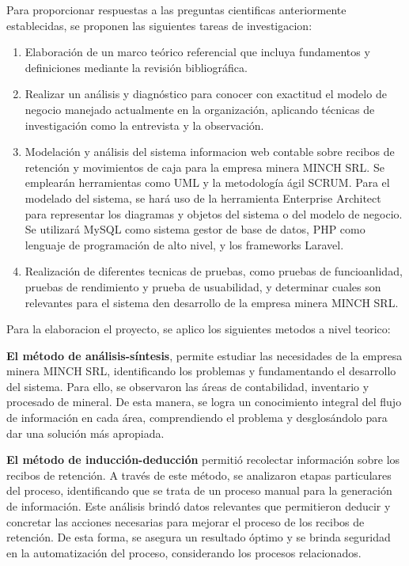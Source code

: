 \documentclass[stu]{apa7}
\begin{document}
Para proporcionar respuestas a las preguntas cientificas anteriormente establecidas, se proponen las siguientes tareas de investigacion:

\begin{enumerate}
    \item Elaboración de un marco teórico referencial que incluya fundamentos y definiciones mediante la revisión bibliográfica.

    \item Realizar un análisis y diagnóstico para conocer con exactitud el modelo de negocio manejado actualmente en la organización, aplicando técnicas de investigación como la entrevista y la observación.

    \item Modelación y análisis del sistema informacion web contable sobre recibos de retención y movimientos de caja para la empresa minera MINCH SRL. Se emplearán herramientas como UML y la metodología ágil SCRUM. Para el modelado del sistema, se hará uso de la herramienta Enterprise Architect para representar los diagramas y objetos del sistema o del modelo de negocio. Se utilizará MySQL como sistema gestor de base de datos, PHP como lenguaje de programación de alto nivel, y los frameworks Laravel.

    \item Realización de diferentes tecnicas de pruebas, como pruebas de funcioanlidad, pruebas de rendimiento y prueba de usuabilidad, y determinar cuales son relevantes para el sistema den desarrollo de la empresa minera MINCH SRL.
\end{enumerate}

Para la elaboracion el proyecto, se aplico los siguientes metodos a nivel teorico:

\textbf{El método de análisis-síntesis}, permite estudiar las necesidades de la empresa minera MINCH SRL, identificando los problemas y fundamentando el desarrollo del sistema. Para ello, se observaron las áreas de contabilidad, inventario y procesado de mineral. De esta manera, se logra un conocimiento integral del flujo de información en cada área, comprendiendo el problema y desglosándolo para dar una solución más apropiada.

\textbf{El método de inducción-deducción} permitió recolectar información sobre los recibos de retención. A través de este método, se analizaron etapas particulares del proceso, identificando que se trata de un proceso manual para la generación de información. Este análisis brindó datos relevantes que permitieron deducir y concretar las acciones necesarias para mejorar el proceso de los recibos de retención. De esta forma, se asegura un resultado óptimo y se brinda seguridad en la automatización del proceso, considerando los procesos relacionados.
\end{document}
